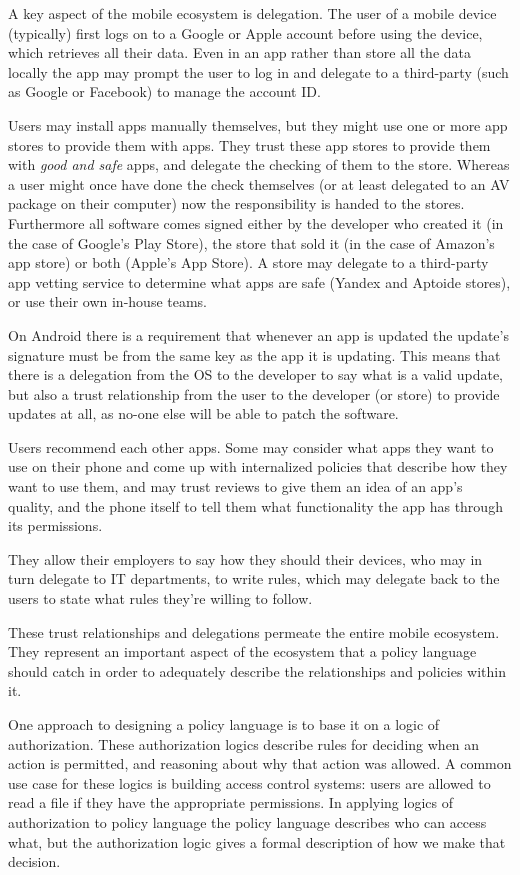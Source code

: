 \documentclass[thesis.tex]{subfiles}
\begin{document}
A key aspect of the mobile ecosystem is delegation.  The user of a
mobile device (typically) first logs on to a Google or Apple account
before using the device, which retrieves all their data.  Even in an
app rather than store all the data locally the app may prompt the user
to log in and delegate to a third-party (such as Google or Facebook)
to manage the account ID.

Users may install apps manually themselves, but they might use one or
more app stores to provide them with apps.  They trust these app
stores to provide them with \emph{good and safe} apps, and delegate
the checking of them to the store.  Whereas a user might once have
done the check themselves (or at least delegated to an \ac{AV} package
on their computer) now the responsibility is handed to the stores.
Furthermore all software comes signed either by the developer who
created it (in the case of Google's Play Store), the store that sold
it (in the case of Amazon's app store) or both (Apple's App Store).  A
store may delegate to a third-party app vetting service to determine
what apps are safe (Yandex and Aptoide stores), or use their own
in-house teams.

On Android there is a requirement that whenever
an app is updated the update's signature must be from the same key as
the app it is updating.  This means that there is a delegation from
the OS to the developer to say what is a valid update, but also a
trust relationship from the user to the developer (or store) to
provide updates at all, as no-one else will be able to patch the
software.

Users recommend each other apps.  Some may consider what apps they
want to use on their phone and come up with internalized policies that
describe how they want to use them, and may trust reviews to give them
an idea of an app's quality, and the phone itself to tell them what
functionality the app has through its permissions.

They allow their employers to say how they should their devices, who
may in turn delegate to IT departments, to write rules, which may
delegate back to the users to state what rules they're willing to
follow.

These trust relationships and delegations permeate the entire mobile
ecosystem.  They represent an important aspect of the ecosystem that a
policy language should catch in order to adequately describe the
relationships and policies within it.

One approach to designing a policy language is to base it on a logic
of authorization.  These authorization logics describe rules for
deciding when an action is permitted, and reasoning about why that
action was allowed.  A common use case for these logics is building
access control systems: users are allowed to read a file if they have
the appropriate permissions.  In applying logics of authorization to
policy language the policy language describes who can access what, but
the authorization logic gives a formal description of how we make that
decision.
\end{document}
